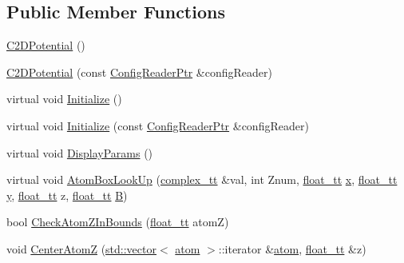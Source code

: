 \subsection*{Public Member Functions}
\begin{DoxyCompactItemize}
\item 
\hyperlink{class_q_s_t_e_m_1_1_c2_d_potential_a18408ea6d5d69bbe2309b011773baf88}{C2\-D\-Potential} ()
\item 
\hyperlink{class_q_s_t_e_m_1_1_c2_d_potential_aa9389a29c2d843ce97a6423804d88157}{C2\-D\-Potential} (const \hyperlink{namespace_q_s_t_e_m_af9424707fe9f6503298f49b41304bd35}{Config\-Reader\-Ptr} \&config\-Reader)
\item 
virtual void \hyperlink{class_q_s_t_e_m_1_1_c2_d_potential_a47cf942dcc9143a9b9e1a6a791724dfd}{Initialize} ()
\item 
virtual void \hyperlink{class_q_s_t_e_m_1_1_c2_d_potential_a967591b1c8aca6857be76559f8affd84}{Initialize} (const \hyperlink{namespace_q_s_t_e_m_af9424707fe9f6503298f49b41304bd35}{Config\-Reader\-Ptr} \&config\-Reader)
\item 
virtual void \hyperlink{class_q_s_t_e_m_1_1_c2_d_potential_aaeb89ba94b9d0c4a57899f00e32fba7b}{Display\-Params} ()
\item 
virtual void \hyperlink{class_q_s_t_e_m_1_1_c2_d_potential_a056a6d429a229fd07f9fc9eb3b6c0a3a}{Atom\-Box\-Look\-Up} (\hyperlink{namespace_q_s_t_e_m_afa320ea3cd2f5ff080c422f81b803a32}{complex\-\_\-tt} \&val, int Znum, \hyperlink{namespace_q_s_t_e_m_a915d7caa497280d9f927c4ce8d330e47}{float\-\_\-tt} \hyperlink{_read_d_m3___matlab_8m_a9336ebf25087d91c818ee6e9ec29f8c1}{x}, \hyperlink{namespace_q_s_t_e_m_a915d7caa497280d9f927c4ce8d330e47}{float\-\_\-tt} \hyperlink{qmb_8m_a2fb1c5cf58867b5bbc9a1b145a86f3a0}{y}, \hyperlink{namespace_q_s_t_e_m_a915d7caa497280d9f927c4ce8d330e47}{float\-\_\-tt} z, \hyperlink{namespace_q_s_t_e_m_a915d7caa497280d9f927c4ce8d330e47}{float\-\_\-tt} \hyperlink{xyz2cfg_8m_a422e4e22a48b9ea42c9dfe12b157229d}{B})
\item 
bool \hyperlink{class_q_s_t_e_m_1_1_c2_d_potential_ac6c40bb5ab50ea27909abfd448427f5a}{Check\-Atom\-Z\-In\-Bounds} (\hyperlink{namespace_q_s_t_e_m_a915d7caa497280d9f927c4ce8d330e47}{float\-\_\-tt} atom\-Z)
\item 
void \hyperlink{class_q_s_t_e_m_1_1_c2_d_potential_a84063f5aa913ca72e7d79e780435b3f7}{Center\-Atom\-Z} (\hyperlink{qmb_8m_af54b69a32590de218622e869b06b47b3}{std\-::vector}$<$ \hyperlink{namespace_q_s_t_e_m_a402dabc31a7a1fe906d0cdd138c69686}{atom} $>$\-::iterator \&\hyperlink{namespace_q_s_t_e_m_a402dabc31a7a1fe906d0cdd138c69686}{atom}, \hyperlink{namespace_q_s_t_e_m_a915d7caa497280d9f927c4ce8d330e47}{float\-\_\-tt} \&z)

\end{DoxyCompactItemize}
